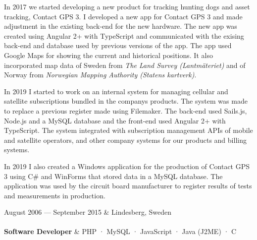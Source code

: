 \documentclass{cv-stylish}
\begin{document}
\begin{center}
\begin{adjustwidth}{0.015\linewidth}{0.015\linewidth}
In 2017 we started developing a new product for tracking hunting dogs
and asset tracking, Contact GPS 3.
I developed a new app for Contact GPS 3 and made adjustment in the
existing back-end for the new hardware. The new app was
created using Angular 2+ with TypeScript and communicated with the
exising back-end and database used by previous versions of the app.
The app used Google Maps for showing the current and historical
positions. It also incorporated map data of Sweden from \emph{The Land
  Survey (Lantmäteriet)} and of Norway from \emph{Norwegian Mapping
  Authority (Statens kartverk)}.

In 2019 I started to work on an internal system for managing cellular and
satellite subscriptions bundled in the companys products. The system
was made to replace a previous register made using Filemaker. The
back-end used Sails.js, Node.js and a MySQL database and the front-end
used Angular 2+ with TypeScript.
The system integrated with subscription management APIs of mobile and
satellite operators, and other company systems for our products and
billing systems.

In 2019 I also created a Windows application for the production of
Contact GPS 3 using C\# and WinForms that stored data in a MySQL
database.
The application was used by the circuit board manufacturer to register
results of tests and measurements in production.

\end{adjustwidth}

\vspace{1em}
\pagebreak
\begin{JobTable}
  August 2006 --- September 2015 & \hfill Lindesberg, Sweden \\[3pt]
   \\[3pt]
  \hspace{5mm} \textbf{Software Developer}
  & \hfill PHP · MySQL · JavaScript · Java (J2ME) · C \\
\end{JobTable}
\begin{adjustwidth}{0.015\linewidth}{0.015\linewidth}


\end{adjustwidth}
\end{center}
\end{document}
